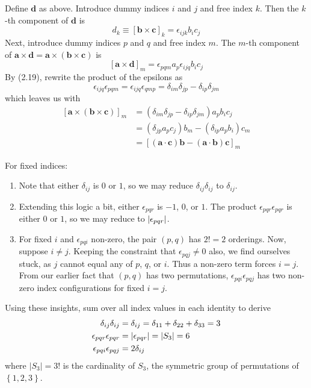 \documentclass[a4paper]{article}
\begin{document}
Define \( \pmb{d} \) as above. Introduce dummy indices \( i \) and \( j \) and free index \( k \). Then the \( k \)-th component of \( \pmb{d} \) is
\[
	d_{k} \equiv \!\left[ \pmb{b} \times \pmb{c} \right]_{k} = \epsilon_{ijk}b_{i}c_{j}
\]
Next, introduce dummy indices \( p \) and \( q \) and free index \( m \). The \( m \)-th component of \( \pmb{a} \times \pmb{d} = \pmb{a} \times \!\left( \pmb{b} \times \pmb{c} \right) \) is
\[
	\!\left[ \pmb{a} \times \pmb{d} \right]_{m} = \epsilon_{pqm}a_{p}\epsilon_{ijq}b_{i}c_{j} 
\]
By (2.19), rewrite the product of the epsilons as 
\[
	\epsilon_{ijq}\epsilon_{pqm} = \epsilon_{ijq}\epsilon_{qmp} = \delta_{im}\delta_{jp} - \delta_{ip}\delta_{jm} 
\]
which leaves us with
\begin{align*}
	\!\left[ \pmb{a} \times \!\left( \pmb{b} \times \pmb{c} \right) \right]_{m} & = \!\left( \delta_{im}\delta_{jp} - \delta_{ip}\delta_{jm} \right)a_{p}b_{i}c_{j} \\
	 & = \!\left( \delta_{jp}a_{p}c_{j} \right)b_{m} - \!\left( \delta_{ip}a_{p}b_{i} \right)c_{m} \\ 
	 & = \!\left[ \!\left( \pmb{a} \cdot \pmb{c} \right)\pmb{b} - \!\left( \pmb{a} \cdot \pmb{b} \right)\pmb{c} \right]_{m}
\end{align*}

For fixed indices:
\begin{enumerate}[label=(\alph*)]
	\item Note that either \( \delta_{ij} \) is \( 0 \) or \( 1 \), so we may reduce \( \delta_{ij}\delta_{ij} \) to \( \delta_{ij} \).
	\item Extending this logic a bit, either \( \epsilon_{pqr} \) is \( -1 \), \( 0 \), or \( 1 \). The product \( \epsilon_{pqr}\epsilon_{pqr} \) is either \( 0 \) or \( 1 \), so we may reduce to \( \abs{\epsilon_{pqr}} \).
	\item For fixed \( i \) and \( \epsilon_{pqi} \) non-zero, the pair \( \!\left( p,q \right) \) has \( 2! = 2 \) orderings. Now, suppose \( i \neq j \). Keeping the constraint that \( \epsilon_{pqj} \neq 0 \) also, we find ourselves stuck, as \( j \) cannot equal any of \( p \), \( q \), or \( i \). Thus a non-zero term forces \( i = j \). From our earlier fact that \( \!\left( p,q \right) \) has two permutations, \( \epsilon_{pqi}\epsilon_{pqj} \) has two non-zero index configurations for fixed \( i = j \).
\end{enumerate}
Using these insights, sum over all index values in each identity to derive
\begin{align*}
	\delta_{ij}\delta_{ij} & = \delta_{ij} = \delta_{11} + \delta_{22} + \delta_{33} = 3 \\
	\epsilon_{pqr}\epsilon_{pqr} & = \abs{\epsilon_{pqr}} = \lvert S_3 \rvert = 6 \\ 	       \epsilon_{pqi}\epsilon_{pqj} & = 2 \delta_{ij}
\end{align*}
where \( \lvert S_3 \rvert = 3! \) is the cardinality of \( S_{3} \), the symmetric group of permutations of \( \!\left\{ 1,2,3 \right\} \).
\end{document}
